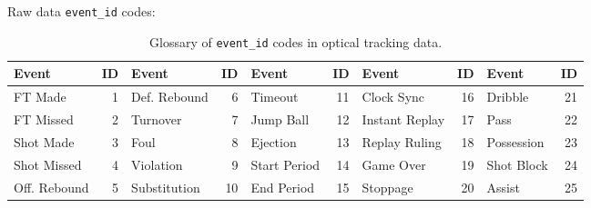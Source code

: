 \documentclass{article}\usepackage[]{graphicx}\usepackage[]{color}
\begin{document}
Raw data \texttt{event\_id} codes:
\begin{table}[h!]
\begin{tabular}{lr|lr|lr|lr|lr}
\toprule
Event & ID & Event & ID & Event & ID & Event & ID & Event & ID \\
\midrule
FT Made &  1 & Def. Rebound &  6 & Timeout & 11 & Clock Sync & 16 & Dribble & 21 \\
FT Missed &  2 & Turnover &  7 & Jump Ball & 12 & Instant Replay & 17 & Pass & 22 \\
Shot Made &  3 & Foul  & 8 & Ejection & 13 & Replay Ruling & 18 & Possession & 23 \\
Shot Missed &  4 & Violation &  9 & Start Period & 14 & Game Over & 19 & Shot Block & 24 \\
Off. Rebound &  5 &
Substitution & 10 &
End Period & 15 &
Stoppage & 20 &
Assist & 25  \\
\bottomrule
\end{tabular}
\label{tab:event_codes}
\caption{Glossary of \texttt{event\_id} codes in optical tracking data.}
\end{table}
\end{document}
